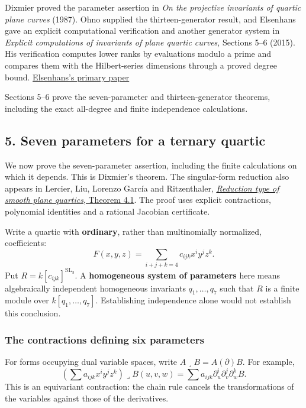 \documentclass[
]{article}
\begin{document}
Dixmier proved the parameter assertion in \emph{On the projective
invariants of quartic plane curves} (1987). Ohno supplied the
thirteen-generator result, and Elsenhans gave an explicit computational
verification and another generator system in \emph{Explicit computations
of invariants of plane quartic curves}, Sections 5--6 (2015). His
verification computes lower ranks by evaluations modulo a prime and
compares them with the Hilbert-series dimensions through a proved degree
bound.
\href{https://math.uni-paderborn.de/fileadmin-eim/mathematik/AG-Computeralgebra/Publications-elsenhans/inv_pl_quart_5a.pdf}{Elsenhans's
primary paper}

Sections 5--6 prove the seven-parameter and thirteen-generator theorems,
including the exact all-degree and finite independence calculations.

\subsection{5. Seven parameters for a ternary quartic}\label{section-5}

We now prove the seven-parameter assertion, including the finite
calculations on which it depends. This is Dixmier's theorem. The
singular-form reduction also appears in Lercier, Liu, Lorenzo García and
Ritzenthaler, \href{https://arxiv.org/pdf/1803.05816v5}{\emph{Reduction
type of smooth plane quartics}, Theorem 4.1}. The proof uses explicit
contractions, polynomial identities and a rational Jacobian certificate.

Write a quartic with \textbf{ordinary}, rather than multinomially
normalized, coefficients: \[
F(x,y,z)=\sum_{i+j+k=4}c_{ijk}x^iy^jz^k.
\] Put \(R=k [c_{ijk}]^{\operatorname{SL}_3}\). A \textbf{homogeneous
system of parameters} here means algebraically independent homogeneous
invariants \(q_1,\ldots,q_7\) such that \(R\) is a finite module over
\(k [q_1,\ldots,q_7]\). Establishing independence alone would not
establish this conclusion.

\subsubsection{The contractions defining six
parameters}\label{the-contractions-defining-six-parameters}

For forms occupying dual variable spaces, write
\(A\mathbin{\lrcorner}B=A(\partial)B\). For example, \[
\left(\sum a_{ijk}x^iy^jz^k\right)\mathbin{\lrcorner}B(u,v,w)
=\sum a_{ijk}\partial_u^i\partial_v^j\partial_w^kB.
\] This is an equivariant contraction: the chain rule cancels the
transformations of the variables against those of the derivatives.
\end{document}
